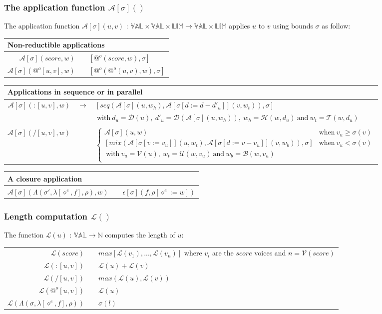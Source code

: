 \documentclass[10pt,a4paper,frenchb]{article}
\makeatletter
\newcommand{\var}[1]{\diamond^#1}
\newcommand{\val}{\mathbb{VAL}}
\newcommand{\closure}{\Lambda}
\newcommand{\noredex}{@^o}
\newcommand{\bounddomain}{\mathbb{LIM}}
\newcommand{\edomain}[3]{$#1 \times #2 \times \bounddomain \rightarrow #3 \times \bounddomain$}
\newcommand{\evalsym}{\epsilon}
\newcommand{\evalmod}[3][\bounds]{\evalsym[#1](#2,#3)}
\newcommand{\envsym}{\rho}
\newcommand{\closenv}[3][\var{e}]{\closure(#3,\lambda[#1,#2],\envsym)}
\newcommand{\seq}			{:}
\newcommand{\mix}			{/}
\newcommand{\apply}[1][\bounds]	{{\mathcal A}[#1]}
\newcommand{\length}		{{\mathcal L}}
\newcommand{\voices}		{{\mathcal V}}
\newcommand{\dur}			{{\mathcal D}}
\newcommand{\head}			{{\mathcal H}}
\newcommand{\tail}			{{\mathcal T}}
\renewcommand{\top}		{{\mathcal U}}
\newcommand{\bottom}		{{\mathcal B}}
\newcommand{\bounds}		{\sigma}
\newcommand{\evaltable}[1][$\rightarrow$]	  {\begin{center} \begin{tabular*}{0.9\linewidth}{rc@{ #1 }l}}
\newcommand{\evaltitle}[1]						{\multicolumn{3}{l}{#1} \\ \hline}
\newcommand{\evaltablend}  		{\end{tabular*}\end{center}}
\newcommand{\evalspace}	  		{\vspace{2mm}\\}
\makeatother
\begin{document}
\subsubsection{The application function $\apply()$}
The application function $\apply(u,v)$ : \edomain{\val}{\val}{\val} applies $u$ to $v$ using bounds $\bounds$ as follow:

\evaltable
 \hline
 \evaltitle {Non-reductible applications} 
	$\apply(score,w)$					& & $[\noredex(score,w), \bounds]$ 
\evalspace
	$\apply(\noredex [u,v],w)$ 		& & $[\noredex(\noredex(u,v),w), \bounds]$ 
\evaltablend
  
\evaltable[]
  \hline
\evaltitle {Applications in sequence or in parallel} 
 $\apply(\seq [u,v],w)$		& $\rightarrow$ & $[ seq(\apply(u,w_h), \apply[{\bounds[d:=d-d'_u]}](v,w_t)),\bounds]$ \\
 								& & $\  \mathrm{with} \   d_u = \dur (u), \   d'_u = \dur (\apply(u,w_h)), \  w_h=\head(w,d_u) \ \mathrm{and} \   w_t=\tail(w,d_u)$ \\
\evalspace
  $\apply(\mix [u,v],w)$			& & $\left\{ \begin{array}{ll}
							 \apply(u,w) & \mathrm{when} \  v_{u} \geq \bounds(v) \\
							 \left[ mix(\apply[{\bounds[v:=v_u]}](u,w_t), \apply[{\bounds[d:=v-v_u]}](v,w_b)),\bounds \right] & \mathrm{when} \  v_u < \bounds(v) \\
 							\  \mathrm{with} \   v_u = \voices (u), \  w_t=\top(w,v_u) \ \mathrm{and} \   w_b=\bottom(w,v_u) & \\
	 							\end{array} \right.$
\evaltablend

\evaltable
  \hline
\evaltitle {A closure application} 
 $\apply(\closenv{f}{\bounds{'}},w)$ 	& & $\evalmod{f}{\envsym[\var{e} := w]}$
\evaltablend


\subsubsection{Length computation $\length()$}
The function $\length(u)$ : $\val \rightarrow \mathbb{N}$ computes the length of $u$:

\begin{center}
\begin{tabular}{rc@{ $\rightarrow$ }l}
 \hline
 $\length(score)$				& & $max[\length(v_1),...,\length(v_n)]$ where $v_i$ are the $score$ voices and $n=\voices(score)$ \\
 $\length(\seq [u,v])$		& & $\length(u) + \length(v)$ \\
 $\length(/ [u,v])$ 			& & $max(\length(u), \length(v))$ \\
 $\length(\noredex [u,v])$ 	& & $\length(u)$ \\
 $\length(\closenv{f}{\bounds})$ 	& & $\bounds(l)$ \\
 \hline
\end{tabular}
\end{center}
\end{document}
